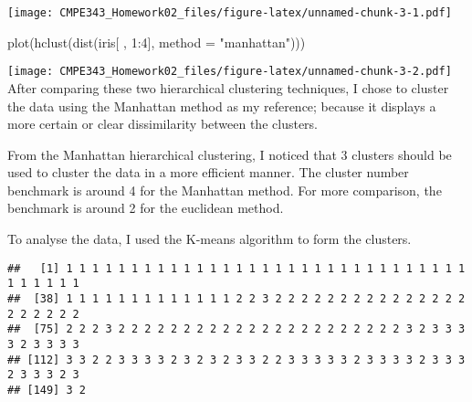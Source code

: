 \documentclass[
]{article}
\newenvironment{Shaded}{\begin{snugshade}}{\end{snugshade}}
\newcommand{\AttributeTok}[1]{\textcolor[rgb]{0.77,0.63,0.00}{#1}}
\newcommand{\CommentTok}[1]{\textcolor[rgb]{0.56,0.35,0.01}{\textit{#1}}}
\newcommand{\DecValTok}[1]{\textcolor[rgb]{0.00,0.00,0.81}{#1}}
\newcommand{\FunctionTok}[1]{\textcolor[rgb]{0.00,0.00,0.00}{#1}}
\newcommand{\NormalTok}[1]{#1}
\newcommand{\OtherTok}[1]{\textcolor[rgb]{0.56,0.35,0.01}{#1}}
\newcommand{\SpecialCharTok}[1]{\textcolor[rgb]{0.00,0.00,0.00}{#1}}
\newcommand{\StringTok}[1]{\textcolor[rgb]{0.31,0.60,0.02}{#1}}
\begin{document}
\texttt{[image: CMPE343\_Homework02\_files/figure-latex/unnamed-chunk-3-1.pdf]}

\begin{Shaded}
\begin{Highlighting}[]
\FunctionTok{plot}\NormalTok{(}\FunctionTok{hclust}\NormalTok{(}\FunctionTok{dist}\NormalTok{(iris[ , }\DecValTok{1}\SpecialCharTok{:}\DecValTok{4}\NormalTok{], }\AttributeTok{method =} \StringTok{"manhattan"}\NormalTok{)))}
\end{Highlighting}
\end{Shaded}

\texttt{[image: CMPE343\_Homework02\_files/figure-latex/unnamed-chunk-3-2.pdf]}
After comparing these two hierarchical clustering techniques, I chose to
cluster the data using the Manhattan method as my reference; because it
displays a more certain or clear dissimilarity between the clusters.

From the Manhattan hierarchical clustering, I noticed that 3 clusters
should be used to cluster the data in a more efficient manner. The
cluster number benchmark is around 4 for the Manhattan method. For more
comparison, the benchmark is around 2 for the euclidean method.

To analyse the data, I used the K-means algorithm to form the clusters.

\begin{Shaded}
\end{Shaded}

\begin{verbatim}
##   [1] 1 1 1 1 1 1 1 1 1 1 1 1 1 1 1 1 1 1 1 1 1 1 1 1 1 1 1 1 1 1 1 1 1 1 1 1 1
##  [38] 1 1 1 1 1 1 1 1 1 1 1 1 1 2 2 3 2 2 2 2 2 2 2 2 2 2 2 2 2 2 2 2 2 2 2 2 2
##  [75] 2 2 2 3 2 2 2 2 2 2 2 2 2 2 2 2 2 2 2 2 2 2 2 2 2 2 3 2 3 3 3 3 2 3 3 3 3
## [112] 3 3 2 2 3 3 3 3 2 3 2 3 2 3 3 2 2 3 3 3 3 3 2 3 3 3 3 2 3 3 3 2 3 3 3 2 3
## [149] 3 2
\end{verbatim}
\end{document}
